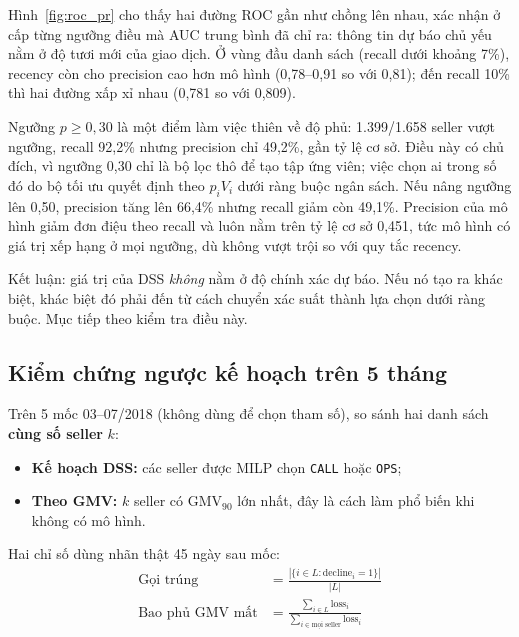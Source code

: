 Hình~\ref{fig:roc_pr} cho thấy hai đường ROC gần như chồng lên nhau, xác nhận ở cấp từng ngưỡng điều mà AUC trung bình đã chỉ ra: thông tin dự báo chủ yếu nằm ở độ tươi mới của giao dịch. Ở vùng đầu danh sách (recall dưới khoảng 7\%), recency còn cho precision cao hơn mô hình (0,78--0,91 so với 0,81); đến recall 10\% thì hai đường xấp xỉ nhau (0,781 so với 0,809).

Ngưỡng $p \ge 0{,}30$ là một điểm làm việc thiên về độ phủ: 1.399/1.658 seller vượt ngưỡng, recall 92,2\% nhưng precision chỉ 49,2\%, gần tỷ lệ cơ sở. Điều này có chủ đích, vì ngưỡng 0,30 chỉ là bộ lọc thô để tạo tập ứng viên; việc chọn ai trong số đó do bộ tối ưu quyết định theo $p_i V_i$ dưới ràng buộc ngân sách. Nếu nâng ngưỡng lên 0,50, precision tăng lên 66,4\% nhưng recall giảm còn 49,1\%. Precision của mô hình giảm đơn điệu theo recall và luôn nằm trên tỷ lệ cơ sở 0,451, tức mô hình có giá trị xếp hạng ở mọi ngưỡng, dù không vượt trội so với quy tắc recency.

Kết luận: giá trị của DSS \emph{không} nằm ở độ chính xác dự báo. Nếu nó tạo ra khác biệt, khác biệt đó phải đến từ cách chuyển xác suất thành lựa chọn dưới ràng buộc. Mục tiếp theo kiểm tra điều này.

\subsection{Kiểm chứng ngược kế hoạch trên 5 tháng}
Trên 5 mốc 03--07/2018 (không dùng để chọn tham số), so sánh hai danh sách \textbf{cùng số seller} $k$:
\begin{itemize}
    \item \textbf{Kế hoạch DSS:} các seller được MILP chọn \texttt{CALL} hoặc \texttt{OPS};
    \item \textbf{Theo GMV:} $k$ seller có $\text{GMV}_{90}$ lớn nhất, đây là cách làm phổ biến khi không có mô hình.
\end{itemize}
Hai chỉ số dùng nhãn thật 45 ngày sau mốc:
\begin{align}
\text{Gọi trúng} &= \frac{|\{i \in L : \text{decline}_i = 1\}|}{|L|} \\
\text{Bao phủ GMV mất} &= \frac{\sum_{i \in L} \text{loss}_i}{\sum_{i \in \text{mọi seller}} \text{loss}_i}
\end{align}

